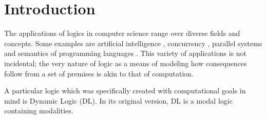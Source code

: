 \chapter{Introduction}


The applications of logics in computer science range over diverse fields and concepts. Some examples are artificial intelligence \cite{hu2016neuralNetworks}, concurrency \cite{caires2003spatial}, parallel systems \cite{iliano2012ccsll} and semantics of programming languages \cite{ellison2012executable}. This variety of applications is not incidental; the very nature of logic as a means of modeling how consequences follow from a set of premises is akin to that of computation.

A particular logic which was specifically created with computational goals in mind is Dynamic Logic (DL).
In its original version, DL is a modal logic containing modalities.